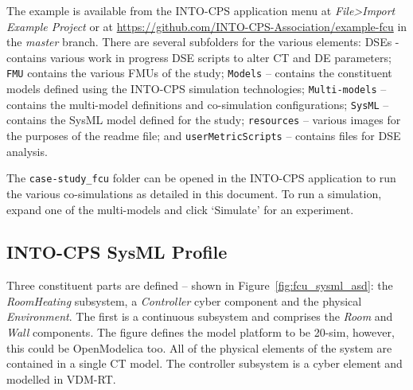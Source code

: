The example is available from the INTO-CPS application menu at \emph{File>Import Example Project} or at \url{https://github.com/INTO-CPS-Association/example-fcu} in the \emph{master} branch. There are several subfolders for the various elements: DSEs - contains various work in progress DSE scripts to alter CT and DE parameters; \texttt{FMU} contains the various FMUs of the study; \texttt{Models} -- contains the constituent models defined using the INTO-CPS simulation technologies; \texttt{Multi-models} -- contains the multi-model definitions and co-simulation configurations; \texttt{SysML} -- contains the SysML model defined for the study; \texttt{resources} -- various images for the purposes of the readme file; and \texttt{userMetricScripts} -- contains files for DSE analysis. 

The \texttt{case-study\_fcu} folder can be opened in the INTO-CPS application to run the various co-simulations as detailed in this document. To run a simulation, expand one of the multi-models and click `Simulate' for an experiment. 

%

\subsection{INTO-CPS SysML Profile}
\label{sec:fcu_into_sysml}

Three constituent parts are defined -- shown in Figure~\ref{fig:fcu_sysml_asd}:  the \emph{RoomHeating} subsystem, a \emph{Controller} cyber component and the physical \emph{Environment}. The first is a continuous subsystem and comprises the \emph{Room} and \emph{Wall} components.  The figure defines the model platform to be 20-sim, however, this could be OpenModelica too. All of the physical elements of the system are contained in a single CT model. The controller subsystem is a cyber element and modelled in VDM-RT.

